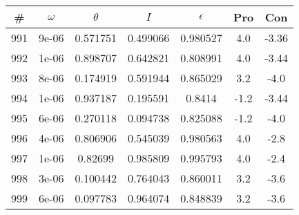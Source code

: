 \begin{table}
\begin{tabular}{c|c|c|c|c|c|c}
\# & $\omega$ & $\theta$ & $I$ & $\epsilon$ & Pro & Con\\
\hline
991 & 9e-06 & 0.571751 & 0.499066 & 0.980527 & 4.0 & -3.36\\
992 & 1e-06 & 0.898707 & 0.642821 & 0.808991 & 4.0 & -3.44\\
993 & 8e-06 & 0.174919 & 0.591944 & 0.865029 & 3.2 & -4.0\\
994 & 1e-06 & 0.937187 & 0.195591 & 0.8414 & -1.2 & -3.44\\
995 & 6e-06 & 0.270118 & 0.094738 & 0.825088 & -1.2 & -4.0\\
996 & 4e-06 & 0.806906 & 0.545039 & 0.980563 & 4.0 & -2.8\\
997 & 1e-06 & 0.82699 & 0.985809 & 0.995793 & 4.0 & -2.4\\
998 & 3e-06 & 0.100442 & 0.764043 & 0.860011 & 3.2 & -3.6\\
999 & 6e-06 & 0.097783 & 0.964074 & 0.848839 & 3.2 & -3.6\\
\end{tabular}
\end{table}